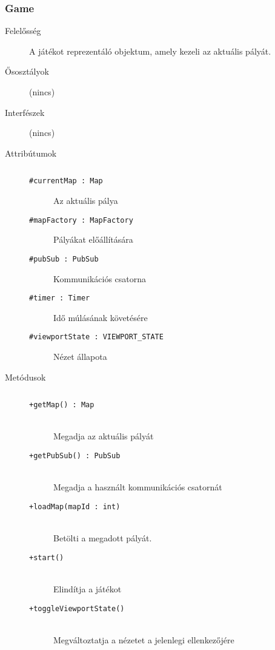 		\subsubsection{Game}
			\begin{description}

				\item[Felelősség] A játékot reprezentáló objektum, amely kezeli az aktuális pályát.

				\item[Ősosztályok] (nincs)
				\item[Interfészek] (nincs)
				\item[Attribútumok]$\ $
					\begin{description}
						\item[\texttt{\#currentMap : Map}]Az aktuális pálya
						\item[\texttt{\#mapFactory : MapFactory}]Pályákat előállítására
						\item[\texttt{\#pubSub : PubSub}]Kommunikációs csatorna
						\item[\texttt{\#timer : Timer}]Idő múlásának követésére
						\item[\texttt{\#viewportState : VIEWPORT\_STATE}]Nézet állapota
					\end{description}
				\item[Metódusok]$\ $
					\begin{description}
						\item[\texttt{+getMap() : Map}] \hfill \\Megadja az aktuális pályát 
						\item[\texttt{+getPubSub() : PubSub}] \hfill \\Megadja a használt kommunikációs csatornát 
						\item[\texttt{+loadMap(mapId : int)}] \hfill \\Betölti a megadott pályát. 
						\item[\texttt{+start()}] \hfill \\Elindítja a játékot 
						\item[\texttt{+toggleViewportState()}] \hfill \\Megváltoztatja a nézetet a jelenlegi ellenkezőjére 
					\end{description}
			\end{description}

